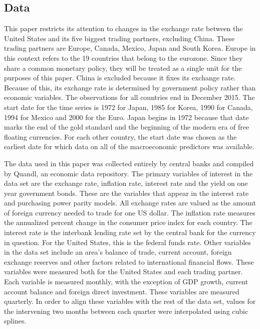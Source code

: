 \documentclass{sig-alternate-05-2015}
\begin{document}
\subsection{Data}
This paper restricts its attention to changes in the exchange rate between the United States and its five biggest trading partners, excluding China. These trading partners are Europe, Canada, Mexico, Japan and South Korea. Europe in this context refers to the 19 countries that belong to the eurozone. Since they share a common monetary policy, they will be treated as a single unit for the purposes of this paper. China is excluded because it fixes its exchange rate. Because of this, its exchange rate is determined by government policy rather than economic variables. The observations for all countries end in December 2015. The start date for the time series is 1972 for Japan, 1985 for Korea, 1990 for Canada, 1994 for Mexico and 2000 for the Euro. Japan begins in 1972 because that date marks the end of the gold standard and the beginning of the modern era of free floating currencies. For each other country, the start date was chosen as the earliest date for which data on all of the macroeconomic predictors was available. 
\par{} The data used in this paper was collected entirely by central banks and compiled by Quandl, an economic data repository. The primary variables of interest in the data set are the exchange rate, inflation rate, interest rate and the yield on one year government bonds. These are the variables that appear in the interest rate and purchasing power parity models. All exchange rates are valued as the amount of foreign currency needed to trade for one US dollar. The inflation rate measures the annualized percent change in the consumer price index for each country. The interest rate is the interbank lending rate set by the central bank for the currency in question. For the United States, this is the federal funds rate.  Other variables in the data set include an area's balance of trade, current account, foreign exchange reserves and other factors related to international financial flows. These variables were measured both for the United States and each trading partner. Each variable is measured monthly, with the exception of GDP growth, current account balance and foreign direct investment. These variables are measured quarterly. In order to align these variables with the rest of the data set, values for the intervening two months between each quarter were interpolated using cubic splines.
\end{document}
